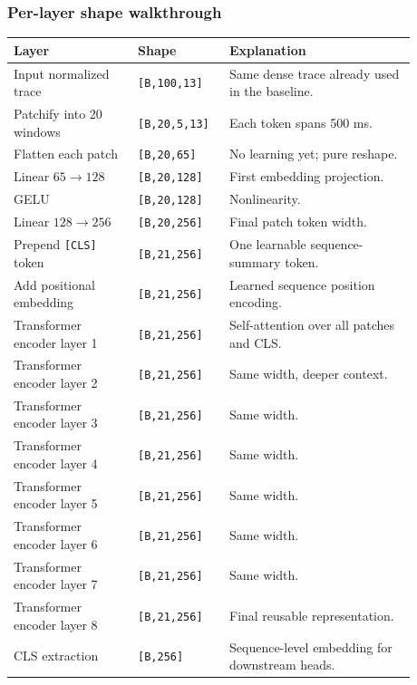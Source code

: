 \documentclass[11pt]{article}
\newcommand{\toprule}{\hline}
\newcommand{\midrule}{\hline}
\newcommand{\bottomrule}{\hline}
\begin{document}
\subsubsection*{Per-layer shape walkthrough}

\begin{center}
\begin{tabular}{p{0.28\linewidth} p{0.18\linewidth} p{0.42\linewidth}}
\toprule
\textbf{Layer} & \textbf{Shape} & \textbf{Explanation} \\
\midrule
Input normalized trace & \texttt{[B,100,13]} & Same dense trace already used in the baseline. \\
Patchify into 20 windows & \texttt{[B,20,5,13]} & Each token spans 500 ms. \\
Flatten each patch & \texttt{[B,20,65]} & No learning yet; pure reshape. \\
Linear \(65 \rightarrow 128\) & \texttt{[B,20,128]} & First embedding projection. \\
GELU & \texttt{[B,20,128]} & Nonlinearity. \\
Linear \(128 \rightarrow 256\) & \texttt{[B,20,256]} & Final patch token width. \\
Prepend \texttt{[CLS]} token & \texttt{[B,21,256]} & One learnable sequence-summary token. \\
Add positional embedding & \texttt{[B,21,256]} & Learned sequence position encoding. \\
Transformer encoder layer 1 & \texttt{[B,21,256]} & Self-attention over all patches and CLS. \\
Transformer encoder layer 2 & \texttt{[B,21,256]} & Same width, deeper context. \\
Transformer encoder layer 3 & \texttt{[B,21,256]} & Same width. \\
Transformer encoder layer 4 & \texttt{[B,21,256]} & Same width. \\
Transformer encoder layer 5 & \texttt{[B,21,256]} & Same width. \\
Transformer encoder layer 6 & \texttt{[B,21,256]} & Same width. \\
Transformer encoder layer 7 & \texttt{[B,21,256]} & Same width. \\
Transformer encoder layer 8 & \texttt{[B,21,256]} & Final reusable representation. \\
CLS extraction & \texttt{[B,256]} & Sequence-level embedding for downstream heads. \\
\bottomrule
\end{tabular}
\end{center}
\end{document}
